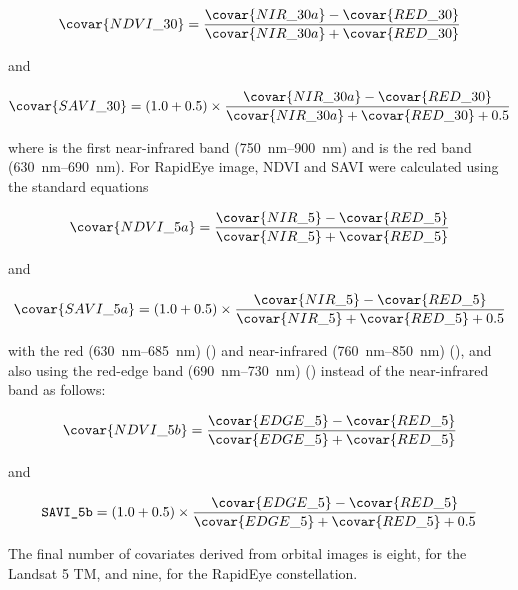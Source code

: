 \begin{equation}
  \covar{NDVI\_30} = \frac{\covar{NIR\_30a} - \covar{RED\_30}}{\covar{NIR\_30a} + \covar{RED\_30}}
\end{equation}\label{eq:NDVI30}

\noindent and

\begin{equation}
  \covar{SAVI\_30} = (1.0 + 0.5) \times \frac{\covar{NIR\_30a} - \covar{RED\_30}}{\covar{NIR\_30a} + 
  \covar{RED\_30} + 0.5}
\end{equation}\label{eq:SAVI30}

\noindent where  is the first near-infrared band (\SIrange{750}{900}{\nm}) and  is the
red band (\SIrange{630}{690}{\nm}). For RapidEye image, NDVI and SAVI were calculated using the standard equations

\begin{equation}
  \covar{NDVI\_5a} = \frac{\covar{NIR\_5} - \covar{RED\_5}}{\covar{NIR\_5} + \covar{RED\_5}}
\end{equation}\label{eq:NDVI5a}

\noindent and

\begin{equation}
  \covar{SAVI\_5a} = (1.0 + 0.5) \times \frac{\covar{NIR\_5} - \covar{RED\_5}}{\covar{NIR\_5} + \covar{RED\_5} + 0.5}
\end{equation}\label{eq:SAVI5a}

\noindent with the red (\SIrange{630}{685}{\nm}) () and near-infrared (\SIrange{760}{850}{\nm}) 
(), and also using the red-edge band (\SIrange{690}{730}{\nm}) () instead of the 
near-infrared band as follows:

\begin{equation}
  \covar{NDVI\_5b} = \frac{\covar{EDGE\_5} - \covar{RED\_5}}{\covar{EDGE\_5} + \covar{RED\_5}}
\end{equation}\label{eq:NDVI5a}

\noindent and

\begin{equation}
  \texttt{SAVI\_5b} = (1.0 + 0.5) \times \frac{\covar{EDGE\_5} - \covar{RED\_5}}{\covar{EDGE\_5} + \covar{RED\_5} + 
  0.5}
\end{equation}\label{eq:SAVI5a}

The final number of covariates derived from orbital images is eight, for the Landsat 5 TM, and nine, for 
the RapidEye constellation.
